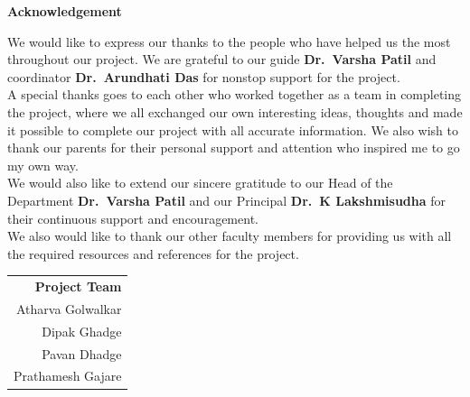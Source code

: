\begin{center}
    \fontsize{25pt}{18pt} {\textbf{Acknowledgement}}
\end{center}

\vspace{0.5in}

\noindent
We would like to express our thanks to the people who have helped us the most throughout our project. We are grateful to our guide \textbf{Dr.\ Varsha Patil} and coordinator \textbf{Dr.\ Arundhati Das} for nonstop support for the project.
\vspace{2pt}\\ A special thanks goes to each other who worked together as a team in completing the project, where we all exchanged our own interesting ideas, thoughts and made it possible to complete our project with all accurate information. We also wish to thank our parents for their personal support and attention who inspired me to go my own way. 
\vspace{2pt}\\ We would also like to extend our sincere gratitude to our Head of the Department \textbf{Dr.\ Varsha Patil} and our Principal \textbf{Dr.\ K Lakshmisudha} for their continuous support and encouragement. 
\vspace{2pt}\\ We also would like to thank our other faculty members for providing us with all the required resources and references for the project. 

\vspace{50pt}

 \noindent \begin{tabular}{r}
    \textbf{Project Team} \\
    Atharva Golwalkar\\
    Dipak Ghadge\\
    Pavan Dhadge\\
    Prathamesh Gajare\\
    \end{tabular}
